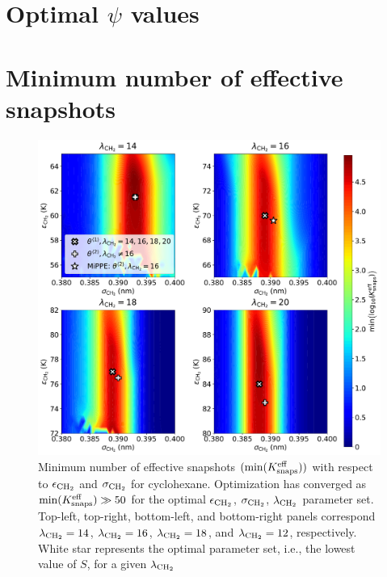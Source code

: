 \documentclass[journal=jctc,manuscript=article]{achemso}
\begin{document}
\newpage

\section{Optimal $\psi$ values} \label{SI sec: eps scale}

\newpage
\clearpage

\section{Minimum number of effective snapshots} \label{SI sec: Min eff}

	\begin{figure}[htb!]
		\centering
		\includegraphics[width=6.4in]{CYC6_min_Neff_lam_iteration.pdf}
		\caption{Minimum number of effective snapshots $(\min(K_{\rm snaps}^{\rm eff}))$ with respect to $\epsilon_{\rm CH_2}$ and $\sigma_{\rm CH_2}$ for cyclohexane. Optimization has converged as $\min(K_{\rm snaps}^{\rm eff}) \gg 50$ for the optimal $\epsilon_{\rm CH_2}$, $\sigma_{\rm CH_2}$, $\lambda_{\rm CH_2}$ parameter set. Top-left, top-right, bottom-left, and bottom-right panels correspond $\lambda_{\rm CH_2} = 14$, $\lambda_{\rm CH_2} = 16$, $\lambda_{\rm CH_2} = 18$, and $\lambda_{\rm CH_2} = 12$, respectively. White star represents the optimal parameter set, i.e., the lowest value of $S$, for a given $\lambda_{\rm CH_2}$}
		\label{SI fig:Iterate_Neff_CYC6}
	\end{figure}
\end{document}

